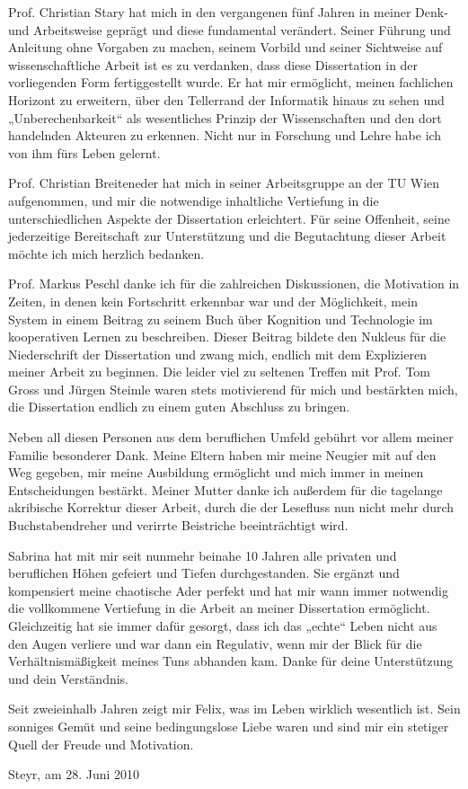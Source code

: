 Prof. Christian Stary hat mich in den vergangenen fünf Jahren in meiner Denk- und Arbeitsweise geprägt und diese fundamental verändert. Seiner Führung und Anleitung ohne Vorgaben zu machen, seinem Vorbild und seiner Sichtweise auf wissenschaftliche Arbeit ist es zu verdanken, dass diese Dissertation in der vorliegenden Form fertiggestellt wurde. Er hat mir ermöglicht, meinen fachlichen Horizont zu erweitern, über den Tellerrand der Informatik hinaus zu sehen und „Unberechenbarkeit“ als wesentliches Prinzip der Wissenschaften und den dort handelnden Akteuren zu erkennen. Nicht nur in Forschung und Lehre habe ich von ihm fürs Leben gelernt.

Prof. Christian Breiteneder hat mich in seiner Arbeitsgruppe an der TU Wien aufgenommen, 
und mir die notwendige inhaltliche Vertiefung in die unterschiedlichen Aspekte der Dissertation erleichtert.
Für seine Offenheit, seine jederzeitige Bereitschaft zur Unterstützung und die Begutachtung dieser Arbeit möchte ich mich herzlich bedanken.

Prof. Markus Peschl danke ich für die zahlreichen Diskussionen, die Motivation in Zeiten, in denen kein Fortschritt erkennbar war und der Möglichkeit, mein System in einem Beitrag zu seinem Buch über Kognition und Technologie im kooperativen Lernen zu beschreiben. Dieser Beitrag bildete den Nukleus für die Niederschrift der Dissertation und zwang mich, endlich mit dem Explizieren meiner Arbeit zu beginnen. Die leider viel zu seltenen Treffen mit Prof. Tom Gross und Jürgen Steimle waren stets motivierend für mich und bestärkten mich, die Dissertation endlich zu einem guten Abschluss zu bringen.

Neben all diesen Personen aus dem beruflichen Umfeld gebührt vor allem meiner Familie besonderer Dank. Meine Eltern haben mir meine Neugier mit auf den Weg gegeben, mir meine Ausbildung ermöglicht und mich immer in meinen Entscheidungen bestärkt. Meiner Mutter danke ich außerdem für die tagelange akribische Korrektur dieser Arbeit, durch die der Lesefluss nun nicht mehr durch Buchstabendreher und verirrte Beistriche beeinträchtigt wird.

Sabrina hat mit mir seit nunmehr beinahe 10 Jahren alle privaten und beruflichen Höhen gefeiert und Tiefen durchgestanden. Sie ergänzt und kompensiert meine chaotische Ader perfekt und hat mir wann immer notwendig die vollkommene Vertiefung in die Arbeit an meiner Dissertation ermöglicht. Gleichzeitig hat sie immer dafür gesorgt, dass ich das „echte“ Leben nicht aus den Augen verliere und war dann ein Regulativ, wenn mir der Blick für die Verhältnismäßigkeit meines Tuns abhanden kam. Danke für deine Unterstützung und dein Verständnis.

Seit zweieinhalb Jahren zeigt mir Felix, was im Leben wirklich wesentlich ist. Sein sonniges Gemüt und seine bedingungslose Liebe waren und sind mir ein stetiger Quell der Freude und Motivation. 

\begin{flushright}
 Steyr, am 28. Juni 2010
\end{flushright}

